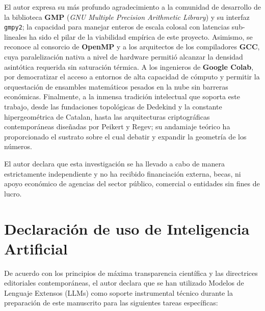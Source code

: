 \documentclass{article}
\numberwithin{equation}{section}
\theoremstyle{plain}
\theoremstyle{definition}
\begin{document}
\begin{ack}
El autor expresa su más profundo agradecimiento a la comunidad de desarrollo de la biblioteca \textbf{GMP} (\textit{GNU Multiple Precision Arithmetic Library}) y su interfaz \texttt{gmpy2}; la capacidad para manejar enteros de escala colosal con latencias sub-lineales ha sido el pilar de la viabilidad empírica de este proyecto. Asimismo, se reconoce al consorcio de \textbf{OpenMP} y a los arquitectos de los compiladores \textbf{GCC}, cuya paralelización nativa a nivel de hardware permitió alcanzar la densidad asintótica requerida sin saturación térmica. A los ingenieros de \textbf{Google Colab}, por democratizar el acceso a entornos de alta capacidad de cómputo y permitir la orquestación de ensambles matemáticos pesados en la nube sin barreras económicas. Finalmente, a la inmensa tradición intelectual que soporta este trabajo, desde las fundaciones topológicas de Dedekind y la constante hipergeométrica de Catalan, hasta las arquitecturas criptográficas contemporáneas diseñadas por Peikert y Regev; su andamiaje teórico ha proporcionado el sustrato sobre el cual debatir y expandir la geometría de los números.
\end{ack}

\begin{funding}
El autor declara que esta investigación se ha llevado a cabo de manera estrictamente independiente y no ha recibido financiación externa, becas, ni apoyo económico de agencias del sector público, comercial o entidades sin fines de lucro.
\end{funding}

\section*{Declaración de uso de Inteligencia Artificial}
De acuerdo con los principios de máxima transparencia científica y las directrices editoriales contemporáneas, el autor declara que se han utilizado Modelos de Lenguaje Extensos (LLMs) como soporte instrumental técnico durante la preparación de este manuscrito para las siguientes tareas específicas:
\end{document}
